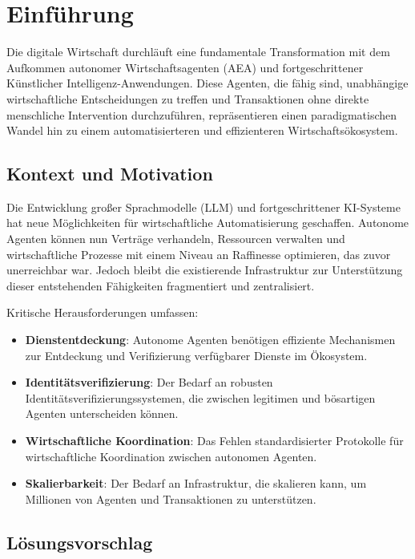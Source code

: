 \documentclass[12pt,a4paper]{article}
\begin{document}
\newpage
\tableofcontents
\newpage

\section{Einführung}

Die digitale Wirtschaft durchläuft eine fundamentale Transformation mit dem Aufkommen autonomer Wirtschaftsagenten (AEA) und fortgeschrittener Künstlicher Intelligenz-Anwendungen. Diese Agenten, die fähig sind, unabhängige wirtschaftliche Entscheidungen zu treffen und Transaktionen ohne direkte menschliche Intervention durchzuführen, repräsentieren einen paradigmatischen Wandel hin zu einem automatisierteren und effizienteren Wirtschaftsökosystem.

\subsection{Kontext und Motivation}

Die Entwicklung großer Sprachmodelle (LLM) und fortgeschrittener KI-Systeme hat neue Möglichkeiten für wirtschaftliche Automatisierung geschaffen. Autonome Agenten können nun Verträge verhandeln, Ressourcen verwalten und wirtschaftliche Prozesse mit einem Niveau an Raffinesse optimieren, das zuvor unerreichbar war. Jedoch bleibt die existierende Infrastruktur zur Unterstützung dieser entstehenden Fähigkeiten fragmentiert und zentralisiert.

Kritische Herausforderungen umfassen:

\begin{itemize}
\item \textbf{Dienstentdeckung}: Autonome Agenten benötigen effiziente Mechanismen zur Entdeckung und Verifizierung verfügbarer Dienste im Ökosystem.
\item \textbf{Identitätsverifizierung}: Der Bedarf an robusten Identitätsverifizierungssystemen, die zwischen legitimen und bösartigen Agenten unterscheiden können.
\item \textbf{Wirtschaftliche Koordination}: Das Fehlen standardisierter Protokolle für wirtschaftliche Koordination zwischen autonomen Agenten.
\item \textbf{Skalierbarkeit}: Der Bedarf an Infrastruktur, die skalieren kann, um Millionen von Agenten und Transaktionen zu unterstützen.
\end{itemize}

\subsection{Lösungsvorschlag}
\end{document}
